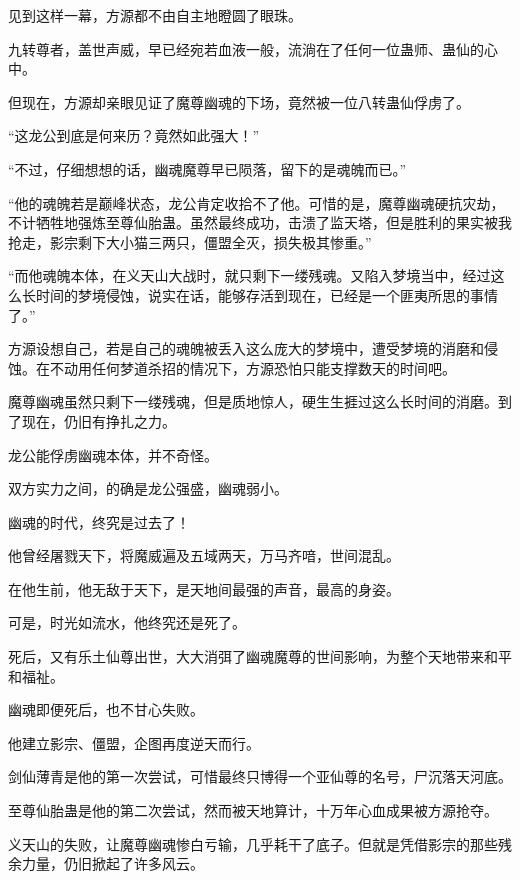 
\begin{this_body}

见到这样一幕，方源都不由自主地瞪圆了眼珠。

九转尊者，盖世声威，早已经宛若血液一般，流淌在了任何一位蛊师、蛊仙的心中。

但现在，方源却亲眼见证了魔尊幽魂的下场，竟然被一位八转蛊仙俘虏了。

“这龙公到底是何来历？竟然如此强大！”

“不过，仔细想想的话，幽魂魔尊早已陨落，留下的是魂魄而已。”

“他的魂魄若是巅峰状态，龙公肯定收拾不了他。可惜的是，魔尊幽魂硬抗灾劫，不计牺牲地强炼至尊仙胎蛊。虽然最终成功，击溃了监天塔，但是胜利的果实被我抢走，影宗剩下大小猫三两只，僵盟全灭，损失极其惨重。”

“而他魂魄本体，在义天山大战时，就只剩下一缕残魂。又陷入梦境当中，经过这么长时间的梦境侵蚀，说实在话，能够存活到现在，已经是一个匪夷所思的事情了。”

方源设想自己，若是自己的魂魄被丢入这么庞大的梦境中，遭受梦境的消磨和侵蚀。在不动用任何梦道杀招的情况下，方源恐怕只能支撑数天的时间吧。

魔尊幽魂虽然只剩下一缕残魂，但是质地惊人，硬生生捱过这么长时间的消磨。到了现在，仍旧有挣扎之力。

龙公能俘虏幽魂本体，并不奇怪。

双方实力之间，的确是龙公强盛，幽魂弱小。

幽魂的时代，终究是过去了！

他曾经屠戮天下，将魔威遍及五域两天，万马齐喑，世间混乱。

在他生前，他无敌于天下，是天地间最强的声音，最高的身姿。

可是，时光如流水，他终究还是死了。

死后，又有乐土仙尊出世，大大消弭了幽魂魔尊的世间影响，为整个天地带来和平和福祉。

幽魂即便死后，也不甘心失败。

他建立影宗、僵盟，企图再度逆天而行。

剑仙薄青是他的第一次尝试，可惜最终只博得一个亚仙尊的名号，尸沉落天河底。

至尊仙胎蛊是他的第二次尝试，然而被天地算计，十万年心血成果被方源抢夺。

义天山的失败，让魔尊幽魂惨白亏输，几乎耗干了底子。但就是凭借影宗的那些残余力量，仍旧掀起了许多风云。


\end{this_body}
